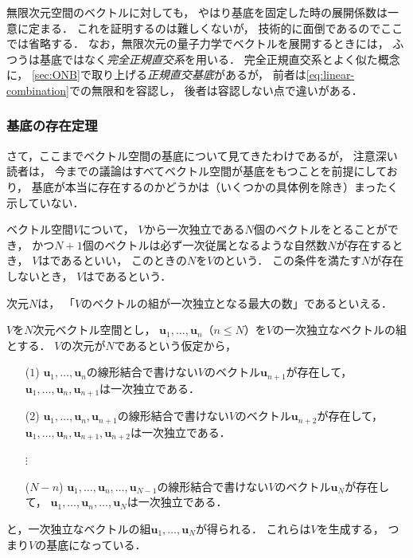 \documentclass[
]{sotsu}
\begin{document}
無限次元空間のベクトルに対しても，
やはり基底を固定した時の展開係数は一意に定まる．
これを証明するのは難しくないが，
技術的に面倒であるのでここでは省略する．
なお，無限次元の量子力学でベクトルを展開するときには，
ふつうは基底ではなく\emph{完全正規直交系}を用いる．
完全正規直交系とよく似た概念に，
\cref{sec:ONB}で取り上げる\emph{正規直交基底}があるが，
前者は\cref{eq:linear-combination}での無限和を容認し，
後者は容認しない点で違いがある．



\subsubsection{基底の存在定理}

さて，ここまでベクトル空間の基底について見てきたわけであるが，
注意深い読者は，
今までの議論はすべてベクトル空間が基底をもつことを前提にしており，
基底が本当に存在するのかどうかは（いくつかの具体例を除き）まったく示していない．

ベクトル空間$V$について，
$V$から一次独立である$N$個のベクトルをとることができ，
かつ$N + 1$個のベクトルは必ず一次従属となるような自然数$N$が存在するとき，
$V$はであるといい，
このときの$N$を$V$のという．
この条件を満たす$N$が存在しないとき，
$V$はであるという．

次元$N$は，
「$V$のベクトルの組が一次独立となる最大の数」であるといえる．

\quad 
$V$を$N$次元ベクトル空間とし，
$\symbf{u}_1, \dots, \symbf{u}_n$（$n \leq N$）を$V$の一次独立なベクトルの組とする．
$V$の次元が$N$であるという仮定から，
\begin{enumerate}[leftmargin={6em}]
    \item[($1$) ] $\symbf{u}_1, \dots, \symbf{u}_n$の線形結合で書けない$V$のベクトル$\symbf{u}_{n+1}$が存在して，
        $\symbf{u}_1, \dots, \symbf{u}_n, \symbf{u}_{n+1}$は一次独立である．
    \item[($2$) ] $\symbf{u}_1, \dots, \symbf{u}_n, \symbf{u}_{n+1}$の線形結合で書けない$V$のベクトル$\symbf{u}_{n+2}$が存在して，
        $\symbf{u}_1, \dots, \symbf{u}_n, \symbf{u}_{n+1}, \symbf{u}_{n+2}$は一次独立である．
    \item[$\vdots$ ] 
    \item[($N-n$) ] $\symbf{u}_1, \dots, \symbf{u}_n, \dots, \symbf{u}_{N-1}$の線形結合で書けない$V$のベクトル$\symbf{u}_N$が存在して，
        $\symbf{u}_1, \dots, \symbf{u}_n, \dots, \symbf{u}_N$は一次独立である．
\end{enumerate}
と，一次独立なベクトルの組$\symbf{u}_1, \dots, \symbf{u}_N$が得られる．
これらは$V$を生成する，
つまり$V$の基底になっている．
\end{document}
